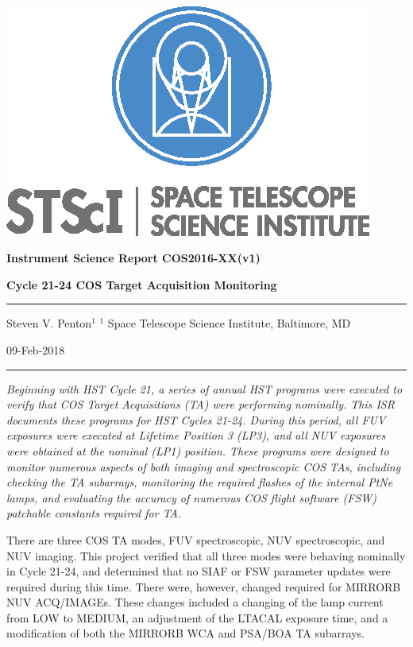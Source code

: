 \documentclass[12pt]{reportj}
\begin{document}
~\\

\vspace{-2.4cm}
\noindent\includegraphics*[width=0.295\linewidth]{new_st_logo.eps}

\vspace{-0.4cm}

\begin{flushright}
{\bf Instrument Science Report COS2016-XX(v1)}

\vspace{1.1cm}

{\bf\Huge Cycle 21-24 COS Target Acquisition Monitoring}

\rule{0.25\linewidth}{0.5pt}

\vspace{0.5cm}
Steven V. Penton$^1$
\linebreak
\newline
\footnotesize{$^1$ Space Telescope Science Institute, Baltimore, MD}
\vspace{0.5cm}

09-Feb-2018
\end{flushright}

\vspace{0.1cm}
\noindent\rule{\linewidth}{1.0pt}

{\it \noindent
Beginning with HST Cycle 21, a series of annual HST programs were executed to verify that COS Target Acquisitions (TA) were performing
nominally.  This ISR documents these programs for HST Cycles 21-24. During this period, all FUV exposures were executed at Lifetime Position 3 (LP3),
and all NUV exposures were obtained at the nominal (LP1) position.
These programs were designed to monitor numerous aspects of both imaging and spectroscopic COS TAs, including
checking the TA subarrays, monitoring the required flashes of the internal PtNe lamps, and evaluating the accuracy of
numerous COS flight software (FSW) patchable constants required for TA.

There are three COS TA modes, FUV spectroscopic, NUV spectroscopic, and NUV imaging.
This project verified that all three modes were behaving nominally in Cycle 21-24, and determined that no SIAF or FSW parameter updates were required during this time.
There were, however, changed required for MIRRORB NUV ACQ/IMAGEs. These changes included a changing of the lamp current from LOW to MEDIUM, an adjustment of the LTACAL exposure time, and a modification of both the MIRRORB WCA and PSA/BOA TA subarrays. }
\end{document}
